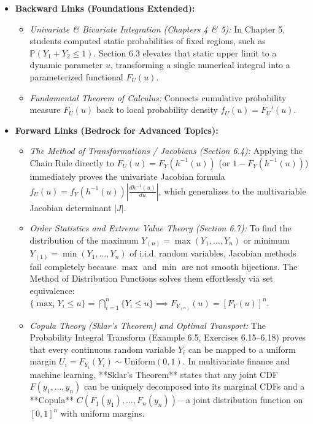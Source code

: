 \documentclass[11pt, letterpaper]{article}
\theoremstyle{definition}
\theoremstyle{remark}
\newcommand{\Prob}{\mathbb{P}}
\begin{document}
\begin{itemize}
    \item \textbf{Backward Links (Foundations Extended):}
    \begin{itemize}
        \item \textit{Univariate \& Bivariate Integration (Chapters 4 \& 5):} In Chapter 5, students computed static probabilities of fixed regions, such as $\Prob(Y_1 + Y_2 \le 1)$. Section 6.3 elevates that static upper limit to a dynamic parameter $u$, transforming a single numerical integral into a parameterized functional $F_U(u)$.
        \item \textit{Fundamental Theorem of Calculus:} Connects cumulative probability measure $F_U(u)$ back to local probability density $f_U(u) = F_U'(u)$.
    \end{itemize}
    \item \textbf{Forward Links (Bedrock for Advanced Topics):}
    \begin{itemize}
        \item \textit{The Method of Transformations / Jacobians (Section 6.4):} Applying the Chain Rule directly to $F_U(u) = F_Y(h^{-1}(u))$ (or $1 - F_Y(h^{-1}(u))$) immediately proves the univariate Jacobian formula $f_U(u) = f_Y(h^{-1}(u))\left|\frac{dh^{-1}(u)}{du}\right|$, which generalizes to the multivariable Jacobian determinant $|J|$.
        \item \textit{Order Statistics and Extreme Value Theory (Section 6.7):} To find the distribution of the maximum $Y_{(n)} = \max(Y_1, \dots, Y_n)$ or minimum $Y_{(1)} = \min(Y_1, \dots, Y_n)$ of i.i.d. random variables, Jacobian methods fail completely because $\max$ and $\min$ are not smooth bijections. The Method of Distribution Functions solves them effortlessly via set equivalence: $\{ \max_i Y_i \le u \} = \bigcap_{i=1}^n \{Y_i \le u\} \implies F_{Y_{(n)}}(u) = [F_Y(u)]^n$.
        \item \textit{Copula Theory (Sklar's Theorem) and Optimal Transport:} The Probability Integral Transform (Example 6.5, Exercises 6.15--6.18) proves that every continuous random variable $Y_i$ can be mapped to a uniform margin $U_i = F_{Y_i}(Y_i) \sim \text{Uniform}(0,1)$. In multivariate finance and machine learning, **Sklar's Theorem** states that any joint CDF $F(y_1, \dots, y_n)$ can be uniquely decomposed into its marginal CDFs and a **Copula** $C(F_1(y_1), \dots, F_n(y_n))$—a joint distribution function on $[0, 1]^n$ with uniform margins.
    \end{itemize}
\end{itemize}
\end{document}

